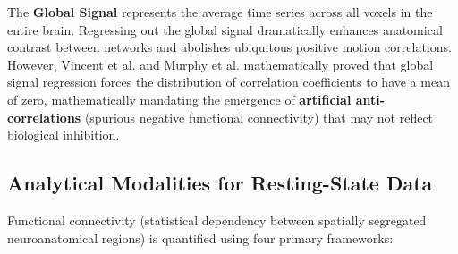 \documentclass[11pt,a4paper]{article}
\begin{document}
\begin{qcbox}
The \textbf{Global Signal} represents the average time series across all voxels in the entire brain. Regressing out the global signal dramatically enhances anatomical contrast between networks and abolishes ubiquitous positive motion correlations. However, Vincent et al. and Murphy et al. mathematically proved that global signal regression forces the distribution of correlation coefficients to have a mean of zero, mathematically mandating the emergence of \textbf{artificial anti-correlations} (spurious negative functional connectivity) that may not reflect biological inhibition.
\end{qcbox}

\subsection{Analytical Modalities for Resting-State Data}
Functional connectivity (statistical dependency between spatially segregated neuroanatomical regions) is quantified using four primary frameworks:
\end{document}
